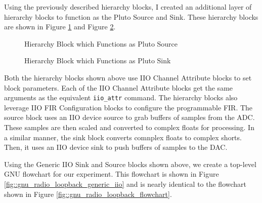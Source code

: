 \documentclass{article}
\begin{document}
Using the previously described hierarchy blocks, I created an additional layer of hierarchy blocks to function as the Pluto Source and Sink. These hierarchy blocks are shown in Figure \ref{fig::pluto_iio_device_source} and Figure \ref{fig::pluto_iio_device_sink}.

\begin{figure}[H]
	\centerline{}
	\caption{Hierarchy Block which Functions as Pluto Source}
	\label{fig::pluto_iio_device_source}
\end{figure}

\begin{figure}[H]
	\centerline{}
	\caption{Hierarchy Block which Functions as Pluto Sink}
	\label{fig::pluto_iio_device_sink}
\end{figure}

Both the hierarchy blocks shown above use IIO Channel Attribute blocks to set block parameters. Each of the IIO Channel Attribute blocks get the same arguments as the equivalent \texttt{iio\_attr} command. The hierarchy blocks also leverage IIO FIR Configuration blocks to configure the programmable FIR. The source block uses an IIO device source to grab buffers of samples from the ADC. These samples are then scaled and converted to complex floats for processing. In a similar manner, the sink block converts comnplex floats to complex shorts. Then, it uses an IIO device sink to push buffers of samples to the DAC. 

Using the Generic IIO Sink and Source blocks shown above, we create a top-level GNU flowchart for our experiment. This flowchart is shown in Figure \ref{fig::gnu_radio_loopback_generic_iio} and is nearly identical to the flowchart shown in Figure \ref{fig::gnu_radio_loopback_flowchart}.
\end{document}
